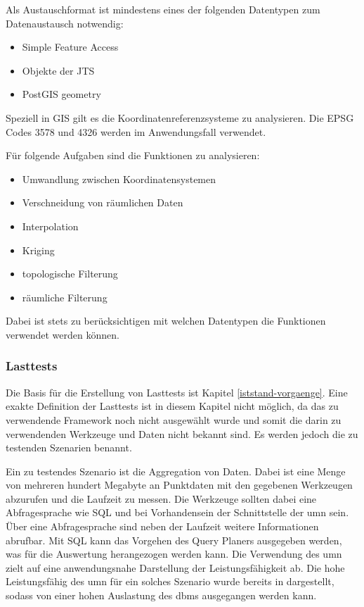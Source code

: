 Als Austauschformat ist mindestens eines der folgenden Datentypen zum Datenaustausch notwendig:
\begin{itemize}
\item Simple Feature Access
\item Objekte der JTS
\item PostGIS geometry
\end{itemize}

Speziell in GIS gilt es die Koordinatenreferenzsysteme zu analysieren.
Die EPSG Codes 3578 und 4326 werden im Anwendungsfall verwendet.

Für folgende Aufgaben sind die Funktionen zu analysieren:
\begin{itemize}
\setlength{\itemsep}{-8pt}
\item Umwandlung zwischen Koordinatensystemen
\item Verschneidung von räumlichen Daten
\item Interpolation
\item Kriging
\item topologische Filterung
\item räumliche Filterung
\end{itemize}
Dabei ist stets zu berücksichtigen mit welchen Datentypen die Funktionen verwendet werden können.

\subsubsection{Lasttests}
Die Basis für die Erstellung von Lasttests ist Kapitel \ref{iststand-vorgaenge}.
Eine exakte Definition der Lasttests ist in diesem Kapitel nicht möglich, da das zu verwendende Framework noch nicht ausgewählt wurde und somit die darin zu verwendenden Werkzeuge und Daten nicht bekannt sind.
Es werden jedoch die zu testenden Szenarien benannt.

Ein zu testendes Szenario ist die Aggregation von Daten.
Dabei ist eine Menge von mehreren hundert Megabyte an Punktdaten mit den gegebenen Werkzeugen abzurufen und die Laufzeit zu messen.
Die Werkzeuge sollten dabei eine Abfragesprache wie SQL und bei Vorhandensein der Schnittstelle der \Gls{umn} sein.
Über eine Abfragesprache sind neben der Laufzeit weitere Informationen abrufbar.
Mit SQL kann das Vorgehen des Query Planers ausgegeben werden, was für die Auswertung herangezogen werden kann.
Die Verwendung des \Gls{umn} zielt auf eine anwendungsnahe Darstellung der Leistungsfähigkeit ab.
Die hohe Leistungsfähig des \Gls{umn} für ein solches Szenario wurde bereits in \cite{ba:kurt} dargestellt, sodass von einer hohen Auslastung des \Gls{dbms} ausgegangen werden kann.

